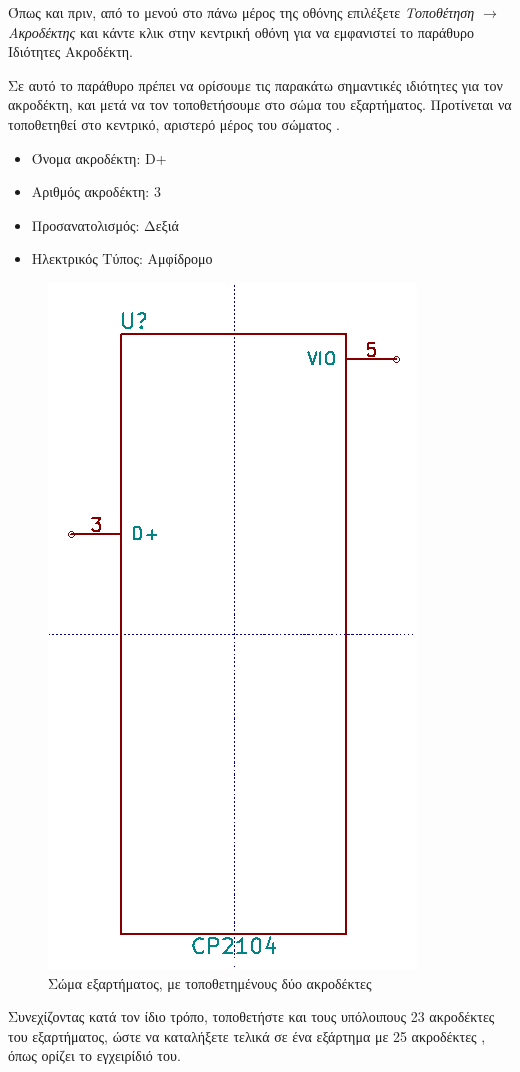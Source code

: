 \documentclass[a4paper]{article}
\begin{document}
Όπως και πριν, από το μενού στο πάνω μέρος της οθόνης επιλέξετε \textit{Τοποθέτηση $\rightarrow$ Ακροδέκτης} και κάντε κλικ στην κεντρική οθόνη για να εμφανιστεί το παράθυρο Ιδιότητες Ακροδέκτη.

Σε αυτό το παράθυρο πρέπει να ορίσουμε τις παρακάτω σημαντικές ιδιότητες για τον ακροδέκτη, και μετά να τον τοποθετήσουμε στο σώμα του εξαρτήματος. Προτίνεται να τοποθετηθεί στο κεντρικό, αριστερό μέρος του σώματος \label{fig:libed-circ-twopinslaced}.

\begin{itemize}
    \item Όνομα ακροδέκτη: D+
    \item Αριθμός ακροδέκτη: 3
    \item Προσανατολισμός: Δεξιά
    \item Ηλεκτρικός Τύπος: Αμφίδρομο
\end{itemize}

\begin{figure}
  \begin{center}
    \includegraphics[width=.2\textwidth]{img/libed-circ-twopinslaced.png}
    \caption{Σώμα εξαρτήματος, με τοποθετημένους δύο ακροδέκτες}
    \label{fig:libed-circ-twopinslaced}
  \end{center}
\end{figure}

Συνεχίζοντας κατά τον ίδιο τρόπο, τοποθετήστε και τους υπόλοιπους 23 ακροδέκτες του εξαρτήματος, ώστε να καταλήξετε τελικά σε ένα εξάρτημα με 25 ακροδέκτες \label{fig:libed-circ-allpinslaced}, όπως ορίζει το εγχειρίδιό του.
\end{document}
